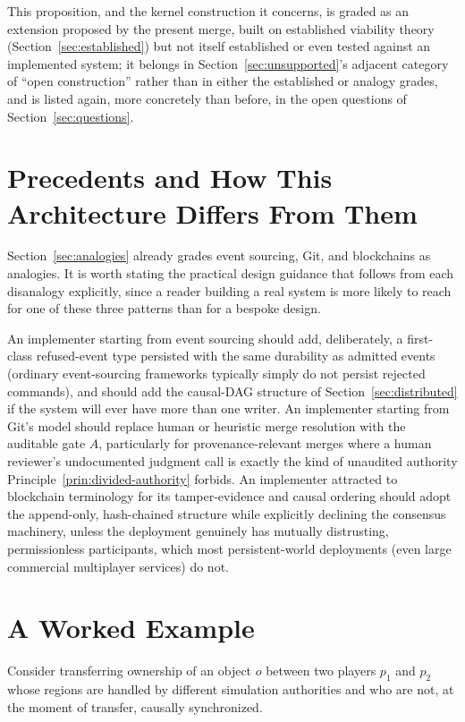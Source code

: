 \documentclass[11pt]{article}
\begin{document}
This proposition, and the kernel construction it concerns, is graded as an extension proposed by the present merge, built on established viability theory (Section~\ref{sec:established}) but not itself established or even tested against an implemented system; it belongs in Section~\ref{sec:unsupported}'s adjacent category of ``open construction'' rather than in either the established or analogy grades, and is listed again, more concretely than before, in the open questions of Section~\ref{sec:questions}.

\section{Precedents and How This Architecture Differs From Them}
\label{sec:precedents}

Section~\ref{sec:analogies} already grades event sourcing, Git, and blockchains as analogies. It is worth stating the practical design guidance that follows from each disanalogy explicitly, since a reader building a real system is more likely to reach for one of these three patterns than for a bespoke design.

An implementer starting from event sourcing should add, deliberately, a first-class refused-event type persisted with the same durability as admitted events (ordinary event-sourcing frameworks typically simply do not persist rejected commands), and should add the causal-DAG structure of Section~\ref{sec:distributed} if the system will ever have more than one writer. An implementer starting from Git's model should replace human or heuristic merge resolution with the auditable gate $A$, particularly for provenance-relevant merges where a human reviewer's undocumented judgment call is exactly the kind of unaudited authority Principle~\ref{prin:divided-authority} forbids. An implementer attracted to blockchain terminology for its tamper-evidence and causal ordering should adopt the append-only, hash-chained structure while explicitly declining the consensus machinery, unless the deployment genuinely has mutually distrusting, permissionless participants, which most persistent-world deployments (even large commercial multiplayer services) do not.

\section{A Worked Example}
\label{sec:worked-example}

Consider transferring ownership of an object $o$ between two players $p_1$ and $p_2$ whose regions are handled by different simulation authorities and who are not, at the moment of transfer, causally synchronized.
\end{document}
